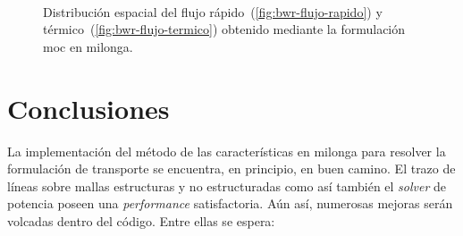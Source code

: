 \documentclass[11pt]{article}
\numberwithin{equation}{section}
\begin{document}
\begin{figure}[!ht]
 \begin{center}
  \\
  \caption{Distribución espacial del flujo rápido~(\ref{fig:bwr-flujo-rapido}) y térmico~(\ref{fig:bwr-flujo-termico}) obtenido mediante la formulación moc en milonga.}
  \label{fig:bwr-flujos}
 \end{center}
\end{figure}


\section{Conclusiones}

La implementación del método de las características en milonga para resolver la formulación de transporte se encuentra, en principio, en buen camino. El trazo de líneas sobre mallas estructuras y no estructuradas como así también el \emph{solver} de potencia poseen una \emph{performance} satisfactoria. Aún así, numerosas mejoras serán volcadas dentro del código. Entre ellas se espera:
\end{document}
